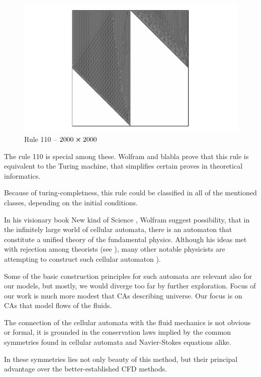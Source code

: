 \begin{figure}
 \centering
 \includegraphics[trim = 40mm 0mm 0mm 0mm, width=1.7\textwidth]{./img/110_2000}
 \caption{Rule 110 -- $2000 \cross 2000$}
\end{figure}


The rule 110 is special among these. Wolfram and blabla prove that this rule is equivalent to the Turing machine, that simplifies certain proves in theoretical informatics.

Because of turing-completness, this rule could be classified in all of the mentioned classes, depending on the initial conditions.




In his visionary book New kind of Science \cite{wolf}, Wolfram suggest possibility, that in the infinitely large world of cellular automata, there is an automaton that constitute a unified theory of the fundamental physics.
Although his ideas met with rejection among theorists (see \cite{aaronson}),
many other notable physicists are attempting to construct such cellular automaton \cite{hooft}).

Some of the basic construction principles for such automata are relevant also for our models, but mostly, we would diverge too far by further exploration.
Focus of our work is much more modest that CAs describing universe.
Our focus is on CAs that model flows of the fluids.

The connection of the cellular automata with the fluid mechanics is not obvious or formal, it is grounded in the conservation laws implied by the common symmetries found in cellular automata and Navier-Stokes equations alike.

In these symmetries lies not only beauty of this method, but their principal advantage over the better-established CFD methods.